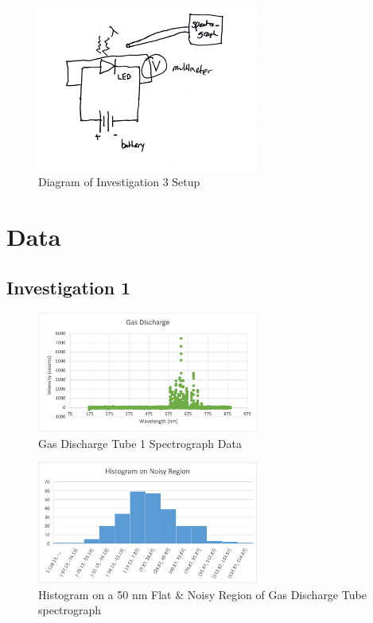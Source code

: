 \documentclass{article}[12pt]
\begin{document}
\begin{figure}
  \centering
  \includegraphics[width=0.65\textwidth]{figures/inv3fig.jpg}
  \caption{Diagram of Investigation 3 Setup}
\end{figure}


\section{Data}

\subsection{Investigation 1}

\begin{figure} [H]
  \centering
  \includegraphics[width=0.65\textwidth]{figures/gas1spec.png}
  \caption{Gas Discharge Tube 1 Spectrograph Data}
  \label{gas1spec}
\end{figure}

\begin{figure} [H]
  \centering
  \includegraphics[width=0.65\textwidth]{figures/histo.png}
  \caption{Histogram on a 50 nm Flat \& Noisy Region of Gas Discharge Tube spectrograph}
  \label{histo}
\end{figure}
\end{document}
